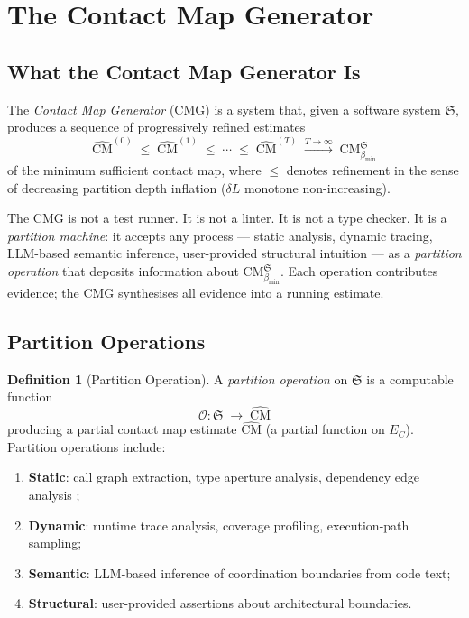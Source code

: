 \documentclass[12pt,a4paper,twocolumn]{article}
\theoremstyle{plain}
\theoremstyle{definition}
\newtheorem{definition}[theorem]{Definition}
\theoremstyle{remark}
\newcommand{\CM}{\mathrm{CM}}
\newcommand{\bmin}{\beta_{\min}}
\newcommand{\CMbmin}{\CM_{\bmin}}
\begin{document}
\section{The Contact Map Generator}
\label{sec:generator}

\subsection{What the Contact Map Generator Is}

The \emph{Contact Map Generator} (CMG) is a system that, given a software
system $\mathfrak{S}$, produces a sequence of progressively refined estimates
\begin{equation}
  \hat{\CM}^{(0)} \;\leq\; \hat{\CM}^{(1)} \;\leq\; \cdots \;\leq\; \hat{\CM}^{(T)}
    \;\xrightarrow{T\to\infty}\; \CMbmin^\mathfrak{S}
\end{equation}
of the minimum sufficient contact map, where $\leq$ denotes refinement in the
sense of decreasing partition depth inflation ($\delta L$ monotone
non-increasing).

The CMG is not a test runner.  It is not a linter.  It is not a type checker.
It is a \emph{partition machine}: it accepts any process --- static analysis,
dynamic tracing, LLM-based semantic inference, user-provided structural
intuition --- as a \emph{partition operation} that deposits information about
$\CMbmin^\mathfrak{S}$.  Each operation contributes evidence; the CMG
synthesises all evidence into a running estimate.

\subsection{Partition Operations}

\begin{definition}[Partition Operation]
\label{def:partition-operation}
A \emph{partition operation} on $\mathfrak{S}$ is a computable function
\begin{equation}
  \mathcal{O} : \mathfrak{S} \;\longrightarrow\; \hat{\CM}
\end{equation}
producing a partial contact map estimate $\hat{\CM}$ (a partial function on
$E_C$).  Partition operations include:
\begin{enumerate}[label=(\alph*)]
  \item \textbf{Static}: call graph extraction, type aperture analysis,
    dependency edge analysis \citep{nielson1999principles, aho2006compilers};
  \item \textbf{Dynamic}: runtime trace analysis, coverage profiling,
    execution-path sampling;
  \item \textbf{Semantic}: LLM-based inference of coordination boundaries
    from code text;
  \item \textbf{Structural}: user-provided assertions about architectural
    boundaries.
\end{enumerate}
\end{definition}
\end{document}
